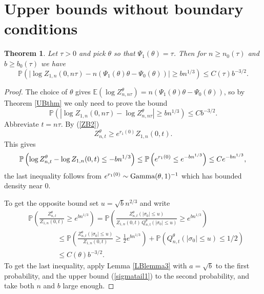 \documentclass[11pt]{amsart}
\newtheorem{theorem}{\sc Theorem}[section]
\numberwithin{equation}{section}
\theoremstyle{remark}
\providecommand{\abs}[1]{\vert#1\vert}
\begin{document}
\section{Upper bounds   without boundary conditions}
\label{sec:freeZ}

\begin{theorem}\label{thm:freeZ}  Let $\tau>0$ and pick ${\theta}$ so that
${\Psi_1}({\theta})=\tau$. 
Then for $n\ge n_0(\tau)$ and $b\ge b_0(\tau)$  we have 
\begin{equation} \label{free0}
{\mathbb{P}}(\abs{\log Z_{1,n}(0,n\tau)-n({\Psi_1}({\theta}){\theta}- {\Psi_0}({\theta})) }
\ge b n^{1/3})\le C(\tau) b^{-3/2}.
\end{equation} 
 \end{theorem}
\begin{proof}
The choice of ${\theta}$ gives ${\mathbb{E}}(\log  Z_ {n,n\tau}^{\theta})=n({\Psi_1}({\theta}){\theta}- {\Psi_0}({\theta}))$, so by 
 Theorem \ref{UBthm} we only need to prove the bound 
\begin{equation}
{\mathbb{P}}(|\log Z_{1,n}(0,n\tau)-\log Z_ {n,n\tau}^{\theta}|\ge b n^{1/3})
\le C b^{-3/2}.
\end{equation}
Abbreviate $t=n\tau$.  
By (\ref{ZB2}) 
\begin{equation}\label{bound}
Z_{n,t}^{\theta}\ge e^{r_1(0)} Z_{1,n}(0,t).
\end{equation}
This gives 
\begin{eqnarray} 
{\mathbb{P}}\left( \log Z_ {n,t}^{\theta} - \log Z_{1,n}(0,t) \le -b n^{1/3} \right)
\le {\mathbb{P}}\left(e^{r_1(0)}\le e^{-b n^{1/3}}  \right) \le C e^{-b n^{1/3}}, {\nonumber}   
\end{eqnarray} 
the last inequality follows from  $e^{r_1(0)}\sim \textup{Gamma}({\theta},1)^{-1}$ which has bounded density   near 0. 
 
To get the opposite bound set $u=\sqrt{b} n^{2/3}$  and write
\begin{equation}\begin{aligned}
&{\mathbb{P}}\left(\frac{Z_{n,t}^{\theta}}{Z_{1,n}(0,t)}\ge e^{b n^{1/3}}\right)={\mathbb{P}}\left(\frac{Z_{n,t}^{\theta}(|\sigma_0|\le u)}{Z_{1,n}(0,t)\, Q_{n,t}^{\theta}(|\sigma_0|\le u)}\ge e^{b n^{1/3}}   \right)\\
& \qquad \qquad \le {\mathbb{P}}\left( \frac{Z_{n,t}^{\theta}(|\sigma_0|\le u)}{Z_{1,n}(0,t) }\ge \frac12 e^{b n^{1/3}}   \right)+
{\mathbb{P}}\left(Q_{n,t}^{\theta}(|\sigma_0|\le u)\le 1/2\right)\\
&\qquad \qquad \le  C({\theta})b^{-3/2}. 
\end{aligned} \label{free3}\end{equation}
To get the last inequality, apply Lemma \ref{LBlemma3} with ${a}=\sqrt b$
to the first probability,  
and the upper bound  (\ref{sigmatail1}) to the second probability, 
and take both $n$ and $b$ large
enough. 
\end{proof}
\end{document}
